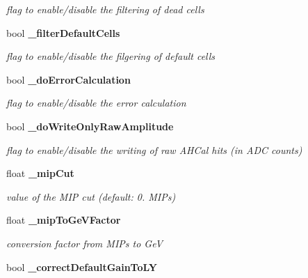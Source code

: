 \begin{DoxyCompactItemize}
\begin{DoxyCompactList}\small\item\em flag to enable/disable the filtering of dead cells \end{DoxyCompactList}\item 
bool {\bf \-\_\-filter\-Default\-Cells}\label{classCALICE_1_1SiPMCalibrateProcessor_a0c500325fa0048790722ea2526a234e6}

\begin{DoxyCompactList}\small\item\em flag to enable/disable the filgering of default cells \end{DoxyCompactList}\item 
bool {\bf \-\_\-do\-Error\-Calculation}\label{classCALICE_1_1SiPMCalibrateProcessor_af3d3d2927e61e4c13cbd4342c25687ae}

\begin{DoxyCompactList}\small\item\em flag to enable/disable the error calculation \end{DoxyCompactList}\item 
bool {\bf \-\_\-do\-Write\-Only\-Raw\-Amplitude}\label{classCALICE_1_1SiPMCalibrateProcessor_ab60bc164b141b85dc9637dab5d88ff52}

\begin{DoxyCompactList}\small\item\em flag to enable/disable the writing of raw A\-H\-Cal hits (in A\-D\-C counts) \end{DoxyCompactList}\item 
float {\bf \-\_\-mip\-Cut}\label{classCALICE_1_1SiPMCalibrateProcessor_ae7a5dacf9857a1f45074aa7668af970a}

\begin{DoxyCompactList}\small\item\em value of the M\-I\-P cut (default\-: 0. M\-I\-Ps) \end{DoxyCompactList}\item 
float {\bf \-\_\-mip\-To\-Ge\-V\-Factor}\label{classCALICE_1_1SiPMCalibrateProcessor_aad74cd9ffd52b8b04928f16750382f74}

\begin{DoxyCompactList}\small\item\em conversion factor from M\-I\-Ps to Ge\-V \end{DoxyCompactList}\item 
bool {\bfseries \-\_\-correct\-Default\-Gain\-To\-L\-Y}\label{classCALICE_1_1SiPMCalibrateProcessor_a9e8a86f294ee86393f3c413bb25fc686}


\end{DoxyCompactItemize}
